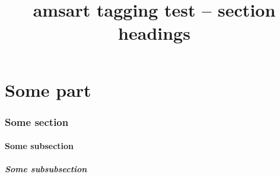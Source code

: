 \documentclass{amsart}
\title{amsart tagging test -- section headings}
\begin{document}
\part{Some part}
\section{Some section}
\subsection{Some subsection}
\subsubsection{Some subsubsection}
\end{document}
